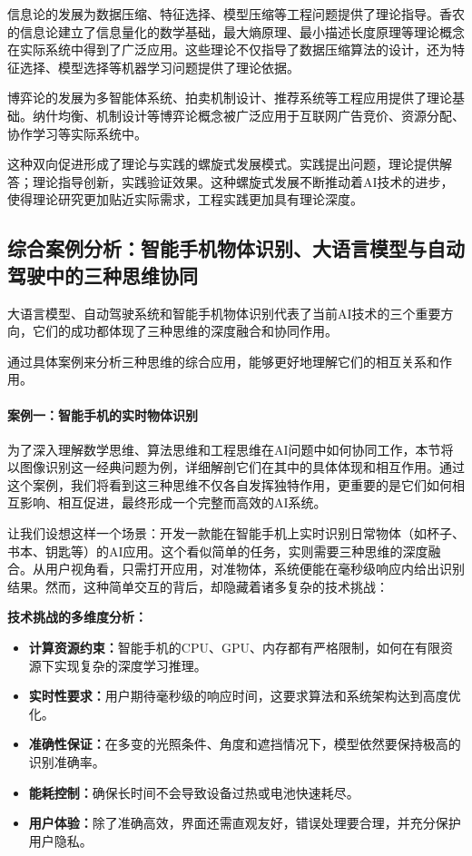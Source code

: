 信息论的发展为数据压缩、特征选择、模型压缩等工程问题提供了理论指导。香农的信息论建立了信息量化的数学基础，最大熵原理、最小描述长度原理等理论概念在实际系统中得到了广泛应用。这些理论不仅指导了数据压缩算法的设计，还为特征选择、模型选择等机器学习问题提供了理论依据。

博弈论的发展为多智能体系统、拍卖机制设计、推荐系统等工程应用提供了理论基础。纳什均衡、机制设计等博弈论概念被广泛应用于互联网广告竞价、资源分配、协作学习等实际系统中。

这种双向促进形成了理论与实践的螺旋式发展模式。实践提出问题，理论提供解答；理论指导创新，实践验证效果。这种螺旋式发展不断推动着AI技术的进步，使得理论研究更加贴近实际需求，工程实践更加具有理论深度。

\subsection{综合案例分析：智能手机物体识别、大语言模型与自动驾驶中的三种思维协同}
大语言模型、自动驾驶系统和智能手机物体识别代表了当前AI技术的三个重要方向，它们的成功都体现了三种思维的深度融合和协同作用。

通过具体案例来分析三种思维的综合应用，能够更好地理解它们的相互关系和作用。

\paragraph{案例一：智能手机的实时物体识别}
为了深入理解数学思维、算法思维和工程思维在AI问题中如何协同工作，本节将以图像识别这一经典问题为例，详细解剖它们在其中的具体体现和相互作用。通过这个案例，我们将看到这三种思维不仅各自发挥独特作用，更重要的是它们如何相互影响、相互促进，最终形成一个完整而高效的AI系统。

让我们设想这样一个场景：开发一款能在智能手机上实时识别日常物体（如杯子、书本、钥匙等）的AI应用。这个看似简单的任务，实则需要三种思维的深度融合。从用户视角看，只需打开应用，对准物体，系统便能在毫秒级响应内给出识别结果。然而，这种简单交互的背后，却隐藏着诸多复杂的技术挑战：

\textbf{技术挑战的多维度分析：}
\begin{itemize}
\item \textbf{计算资源约束：}智能手机的CPU、GPU、内存都有严格限制，如何在有限资源下实现复杂的深度学习推理。
\item \textbf{实时性要求：}用户期待毫秒级的响应时间，这要求算法和系统架构达到高度优化。
\item \textbf{准确性保证：}在多变的光照条件、角度和遮挡情况下，模型依然要保持极高的识别准确率。
\item \textbf{能耗控制：}确保长时间不会导致设备过热或电池快速耗尽。
\item \textbf{用户体验：}除了准确高效，界面还需直观友好，错误处理要合理，并充分保护用户隐私。
\end{itemize}

